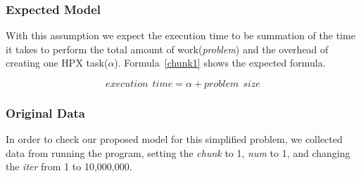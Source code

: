 \subsubsection{Expected Model}
With this assumption we expect the execution time to be summation of the time it takes to perform the total amount of work(\textit{problem}) and the overhead of creating one HPX task($\alpha$). Formula~\ref{chunk1} shows the expected formula.

\begin{equation}\label{chunk1}
execution\:\:time = \alpha + problem\:\:size
\end{equation}  

\vspace{\baselineskip}
\subsubsection{Original Data}
In order to check our proposed model for this simplified problem, we collected data from running the program, setting the \textit{chunk} to 1, \textit{num} to 1, and changing the \textit{iter} from 1 to 10,000,000. 




%
%
%
%
%
%




\vspace{\baselineskip}